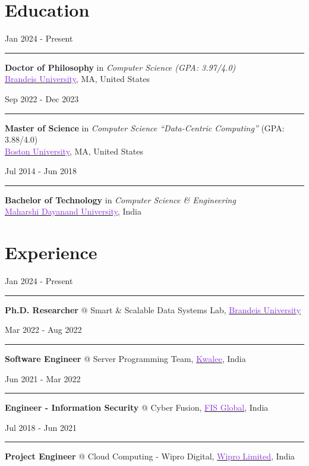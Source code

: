 \documentclass[11pt,a4paper,calibri]{moderncv}
\newcommand{\edu}[2]{
  \noindent
  \begin{minipage}[c]{0.18\textwidth} \hfill #1 \end{minipage}%
  \hspace{0.01\textwidth}
  \begin{minipage}[c]{0.02\textwidth} \textcolor{gray}{\rule{1pt}{0.8cm}} \end{minipage}%
  \begin{minipage}[c]{0.76\textwidth} \raggedright{#2} \end{minipage}%
}
\newcommand{\experience}[2]{
    \noindent
          \begin{minipage}[c]{0.185\textwidth} \begin{flushright} #1 \end{flushright} \end{minipage}%
          \hspace{0.01\textwidth}
          \begin{minipage}[c]{0.02\textwidth} \textcolor{gray}{\rule{1pt}{0.4cm}} \end{minipage}%
          \begin{minipage}[c]{0.755\textwidth} \raggedright{#2} \end{minipage}%
}
\begin{document}
\makecvtitle{}
\vspace{-44pt}

\section{Education}
\edu {Jan 2024 \-- Present}{
    \textbf{Doctor of Philosophy} in \textit{Computer Science (GPA: 3.97/4.0)}\\
    \href{https://www.brandeis.edu/}{\textcolor{blueviolet}{Brandeis University}}, MA, United States
}

\mediumspace{}

\edu{Sep 2022 \-- Dec 2023}
{
	\textbf{Master of Science} in \textit{Computer Science ``Data-Centric Computing''} (GPA: 3.88/4.0)\\
	\href{https://www.bu.edu/}{\textcolor{blueviolet}{Boston University}}, MA, United States
}

\mediumspace{}

\edu{Jul 2014 \-- Jun 2018}
{
	\textbf{Bachelor of Technology} in \textit{Computer Science \& Engineering}\\
	\href{https://mdu.ac.in/}{\textcolor{blueviolet}{Maharshi Dayanand University}}, India
}

\vspace{-0.7em}
\section{Experience}
\vspace{-0.3em}
\experience{Jan 2024 \-- Present}{
	\textbf{Ph.D. Researcher} @ Smart \& Scalable Data Systems Lab, \href{https://www.brandeis.edu/}{\textcolor{blueviolet}{Brandeis University}}
}
\mediumspace{}

\experience{Mar 2022 \-- Aug 2022}{
	\textbf{Software Engineer} @ Server Programming Team, \href{https://www.kwalee.com/}{\textcolor{blueviolet}{Kwalee}}, India
}
\mediumspace{}

\experience{Jun 2021 \-- Mar 2022}{
	\textbf{Engineer \-- Information Security} @ Cyber Fusion, \href{https://www.fisglobal.com/en}{\textcolor{blueviolet}{FIS Global}}, India
}
\mediumspace{}

\experience{Jul 2018 \-- Jun 2021}{
	\textbf{Project Engineer} @ Cloud Computing - Wipro Digital, \href{https://www.wipro.com/}{\textcolor{blueviolet}{Wipro Limited}}, India
}
\end{document}
